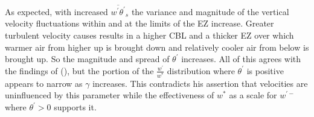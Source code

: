 
As expected, with increased $\overline{w^{'}\theta^{'}}_{s}$ the variance and magnitude of the vertical velocity fluctuations within and at the limits of the \acs{EZ} increase.  Greater turbulent velocity causes results in a higher \acs{CBL} and a thicker \acs{EZ} over which warmer air from higher up is brought down and relatively cooler air from below is brought up.  So the magnitude and spread of $\theta^{'}$ increases. All of this agrees with the findings of \citeauthor{Sorbjan} (\citeyear{Sorbjan}), but the portion of the $\frac{w^{'}}{w^{*}}$ distribution where $\theta^{'}$ is positive appears to narrow as $\gamma$ increases. This contradicts his assertion that velocities are uninfluenced by this parameter while the effectiveness of $w^{*}$ as a scale for $w^{'-}$ where $\theta^{'}>0$ supports it.\\

